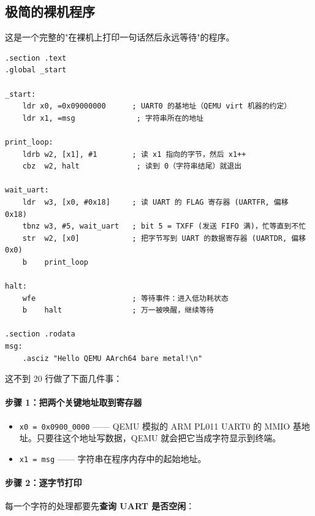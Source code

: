 \subsection{极简的裸机程序}

这是一个完整的"在裸机上打印一句话然后永远等待"的程序。

\begin{lstlisting}[style=asm,caption=QEMU/start.s — 最简裸机程序]
.section .text
.global _start

_start:
    ldr x0, =0x09000000      ; UART0 的基地址（QEMU virt 机器的约定）
    ldr x1, =msg              ; 字符串所在的地址

print_loop:
    ldrb w2, [x1], #1        ; 读 x1 指向的字节，然后 x1++
    cbz  w2, halt             ; 读到 0（字符串结尾）就退出

wait_uart:
    ldr  w3, [x0, #0x18]     ; 读 UART 的 FLAG 寄存器 (UARTFR, 偏移 0x18)
    tbnz w3, #5, wait_uart   ; bit 5 = TXFF (发送 FIFO 满)，忙等直到不忙
    str  w2, [x0]            ; 把字节写到 UART 的数据寄存器 (UARTDR, 偏移 0x0)
    b    print_loop

halt:
    wfe                      ; 等待事件：进入低功耗状态
    b    halt                ; 万一被唤醒，继续等待

.section .rodata
msg:
    .asciz "Hello QEMU AArch64 bare metal!\n"
\end{lstlisting}

这不到 20 行做了下面几件事：

\paragraph{步骤 1：把两个关键地址取到寄存器}
\begin{itemize}
    \item \texttt{x0 = 0x0900\_0000} —— QEMU 模拟的 ARM PL011 UART0 的
        MMIO 基地址。只要往这个地址写数据，QEMU 就会把它当成字符显示到终端。
    \item \texttt{x1 = msg} —— 字符串在程序内存中的起始地址。
\end{itemize}

\paragraph{步骤 2：逐字节打印}
每一个字符的处理都要先\textbf{查询 UART 是否空闲}：

